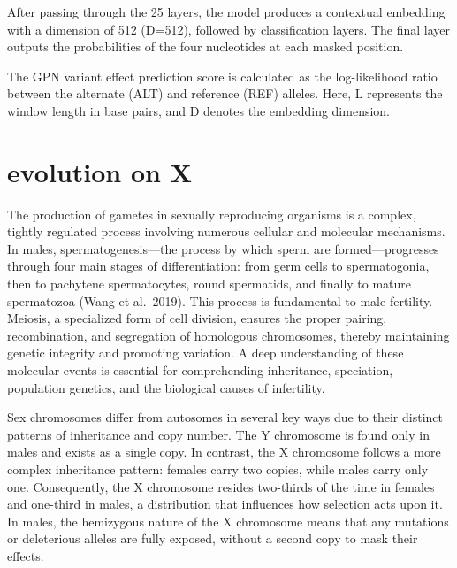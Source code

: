 \documentclass[
  a4paper,
  openany]{scrbook}
\begin{document}
After passing through the 25 layers, the model produces a contextual
embedding with a dimension of 512 (D=512), followed by classification
layers. The final layer outputs the probabilities of the four
nucleotides at each masked position.

The GPN variant effect prediction score is calculated as the
log-likelihood ratio between the alternate (ALT) and reference (REF)
alleles. Here, L represents the window length in base pairs, and D
denotes the embedding dimension.

\section{evolution on X}\label{evolution-on-x}

The production of gametes in sexually reproducing organisms is a
complex, tightly regulated process involving numerous cellular and
molecular mechanisms. In males, spermatogenesis---the process by which
sperm are formed---progresses through four main stages of
differentiation: from germ cells to spermatogonia, then to pachytene
spermatocytes, round spermatids, and finally to mature spermatozoa
\cite{Wang2019}(Wang et al.~2019). This process is fundamental to male
fertility. Meiosis, a specialized form of cell division, ensures the
proper pairing, recombination, and segregation of homologous
chromosomes, thereby maintaining genetic integrity and promoting
variation. A deep understanding of these molecular events is essential
for comprehending inheritance, speciation, population genetics, and the
biological causes of infertility.

Sex chromosomes differ from autosomes in several key ways due to their
distinct patterns of inheritance and copy number. The Y chromosome is
found only in males and exists as a single copy. In contrast, the X
chromosome follows a more complex inheritance pattern: females carry two
copies, while males carry only one. Consequently, the X chromosome
resides two-thirds of the time in females and one-third in males, a
distribution that influences how selection acts upon it. In males, the
hemizygous nature of the X chromosome means that any mutations or
deleterious alleles are fully exposed, without a second copy to mask
their effects.
\end{document}
